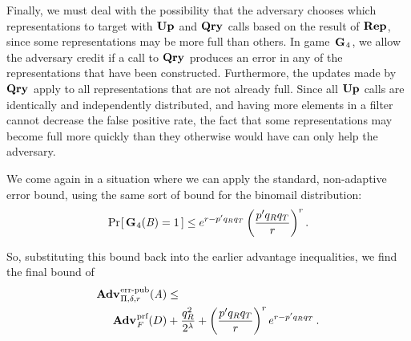 Finally, we must deal with the possibility that the adversary chooses which
representations to target with $\textup{\textbf{Up}}\hspace{0.5pt}$ and $\textup{\textbf{Qry}}\hspace{0.5pt}$ calls based on the result of
$\textup{\textbf{Rep}}\hspace{0.5pt}$, since some representations may be more full than others. In
game~$\textup{\textbf{G}}\hspace{0.5pt}_4$, we allow the adversary credit if a call to
$\textup{\textbf{Qry}}\hspace{0.5pt}$ produces an error in any of the representations that have been
constructed. Furthermore, the updates made by $\textup{\textbf{Qry}}\hspace{0.5pt}$ apply to all
representations that are not already full. Since all $\textup{\textbf{Up}}\hspace{0.5pt}$ calls are
identically and independently distributed, and having more elements in a filter
cannot decrease the false positive rate, the fact that some representations may
become full more quickly than they otherwise would have can only help the
adversary.

We come again in a situation where we can apply the standard, non-adaptive error
bound, using the same sort of bound for the binomail distribution:
\begin{equation}
   \Pr\hspace{-1pt}\left[\,\textup{\textbf{G}}\hspace{0.5pt}_4(\mathit{B})=1\,\right] \le
     e^{r-p'q_Rq_T}\left(\frac{p'q_Rq_T}{r}\right)^r.
\end{equation}

So, substituting this bound back into the earlier advantage inequalities, we find the final bound of
\begin{equation*}
  \begin{aligned}
    \Adv{\errep}_{\Pi,\delta,r}(\advA) &\leq \\
      \Adv{\prf}_F(D) &  +
    \frac{q_R^2}{2^\lambda} +
    \left(\frac{p'q_Rq_T}{r}\right)^re^{r-p'q_Rq_T} \,.
  \end{aligned}
\end{equation*}
